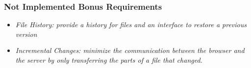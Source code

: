 \subsubsection {Not Implemented Bonus Requirements}
\begin{itemize}
  \item \emph{File History: provide a history for files and an interface to
  restore a previous version}
 \item \emph{Incremental Changes: minimize the communication between the browser
 and the server by only transferring the parts of a file that changed.}
\end{itemize}
